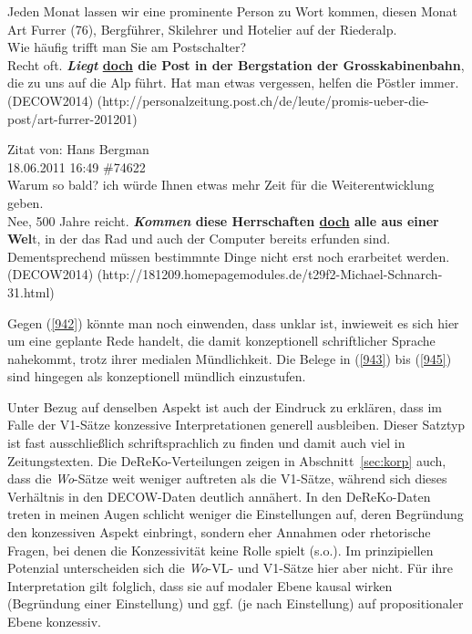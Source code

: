 {\begin{exe}
	\ex\label{944}
	\scriptsize
	Jeden Monat lassen wir eine prominente Person zu Wort kommen, diesen Monat Art Furrer (76), Bergführer, Skilehrer und Hotelier auf der Riederalp.\\
	\newline
	\noindent
	Wie häufig trifft man Sie am Postschalter?\\
	\newline
	\noindent
	Recht oft. \textbf{\textit{Liegt} \underline{doch} die Post in der Bergstation der Grosskabinenbahn}, die zu uns auf die Alp führt. Hat man etwas 			vergessen, helfen die Pöstler immer.			      
	\hfill\hbox{(DECOW2014)}
	\newline  
	\hbox{}\hfill\hbox{(http://personalzeitung.post.ch/de/leute/promis-ueber-die-post/art-furrer-201201)}
\end{exe}

\begin{exe}
	\ex\label{945}
	\scriptsize
	Zitat von: Hans Bergman\\
	18.06.2011 16:49 \#74622\\
	\newline
	\noindent
	Warum so bald? ich würde Ihnen etwas mehr Zeit für die Weiterentwicklung geben.\\
	\newline
	\noindent
	Nee, 500 Jahre reicht. \textbf{\textit{Kommen} diese Herrschaften \underline{doch} alle aus einer Wel}t, in der das Rad und auch der Computer bereits 		erfunden sind. Dementsprechend müssen bestimmnte Dinge nicht erst noch erarbeitet werden.  			      
	\hfill\hbox{(DECOW2014)}
	\newline  
	\hbox{}\hfill\hbox{(http://181209.homepagemodules.de/t29f2-Michael-Schnarch-31.html)}
\end{exe}																	           
Gegen (\ref{942}) könnte man noch einwenden, dass unklar ist, inwieweit es sich hier um eine geplante Rede handelt, die damit konzeptionell schriftlicher Sprache nahekommt, trotz ihrer medialen Mündlichkeit. Die Belege in (\ref{943}) bis (\ref{945}) sind hingegen als konzeptionell mündlich einzustufen.

Unter Bezug auf denselben Aspekt ist auch der Eindruck zu erklären, dass im Falle der V1-Sätze konzessive Interpretationen generell ausbleiben. Dieser Satztyp ist fast ausschließlich schriftsprachlich zu finden und damit auch viel in Zeitungstexten. Die DeReKo-Verteilungen zeigen in Abschnitt~\ref{sec:korp} auch, dass die \textit{Wo}-Sätze weit weniger auftreten als die V1-Sätze, während sich dieses Verhältnis in den DECOW-Daten deutlich annähert. In den DeReKo-Daten treten in meinen Augen schlicht weniger die Einstellungen auf, deren Begründung den konzessiven Aspekt einbringt, sondern eher Annahmen oder rhetorische Fragen, bei denen die Konzessivität keine Rolle spielt (s.o.). Im prinzipiellen Potenzial unterscheiden sich die \textit{Wo}-VL- und V1-Sätze hier aber nicht. Für ihre Interpretation gilt folglich, dass sie auf modaler Ebene kausal wirken (Begründung einer Einstellung) und ggf. (je nach Einstellung) auf propositionaler Ebene konzessiv.

}
